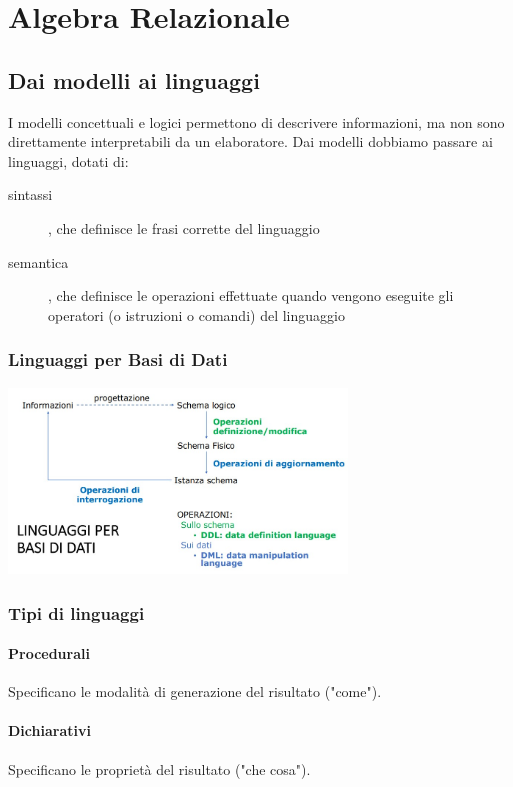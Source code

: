 \chapter{Algebra Relazionale}
\section{Dai modelli ai linguaggi}
I modelli concettuali e logici permettono di descrivere informazioni, ma non sono direttamente interpretabili da un elaboratore. Dai modelli dobbiamo passare ai linguaggi, dotati di: 
\begin{description}
    \item[sintassi], che definisce le frasi corrette del linguaggio 
    \item[semantica], che definisce le operazioni effettuate quando vengono eseguite gli operatori (o istruzioni o comandi) del linguaggio
\end{description}

\subsection{Linguaggi per Basi di Dati}
\begin{center}
    \includegraphics[width=0.675\textwidth]{chaptersLezioniSara/img/AR_linguaggi1.jpg}
\end{center}

\subsection{Tipi di linguaggi}
\subsubsection{Procedurali}
Specificano le modalità di generazione del risultato ("come").
\subsubsection{Dichiarativi}
Specificano le proprietà del risultato ("che cosa").


